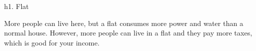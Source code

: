 h1. Flat

More people can live here, but a flat consumes more power and water than a normal house. However, more people can live in a flat and they pay more taxes, which is good for your income.